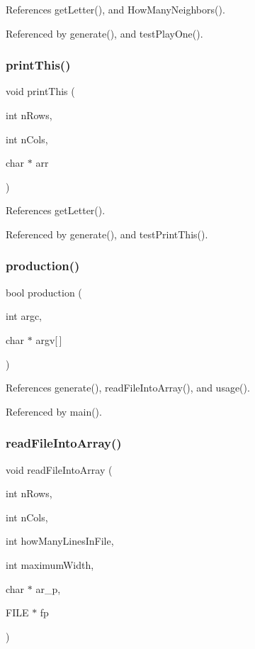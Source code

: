 References get\+Letter(), and How\+Many\+Neighbors().



Referenced by generate(), and test\+Play\+One().

\mbox{\label{production_8h_a64c54ced6f18dab02f59e625d2afa1b2}} 
\subsubsection{print\+This()}
{\footnotesize\ttfamily void print\+This (\begin{DoxyParamCaption}\item[{int}]{n\+Rows,  }\item[{int}]{n\+Cols,  }\item[{char $\ast$}]{arr }\end{DoxyParamCaption})}



References get\+Letter().



Referenced by generate(), and test\+Print\+This().

\mbox{\label{production_8h_a9f67b51c42a54745557e7a2c9c07c46f}} 
\subsubsection{production()}
{\footnotesize\ttfamily bool production (\begin{DoxyParamCaption}\item[{int}]{argc,  }\item[{char $\ast$}]{argv[$\,$] }\end{DoxyParamCaption})}



References generate(), read\+File\+Into\+Array(), and usage().



Referenced by main().

\mbox{\label{production_8h_a0acda6eca9bfeb1059c53811d22b7996}} 
\subsubsection{read\+File\+Into\+Array()}
{\footnotesize\ttfamily void read\+File\+Into\+Array (\begin{DoxyParamCaption}\item[{int}]{n\+Rows,  }\item[{int}]{n\+Cols,  }\item[{int}]{how\+Many\+Lines\+In\+File,  }\item[{int}]{maximum\+Width,  }\item[{char $\ast$}]{ar\+\_\+p,  }\item[{F\+I\+LE $\ast$}]{fp }\end{DoxyParamCaption})}



